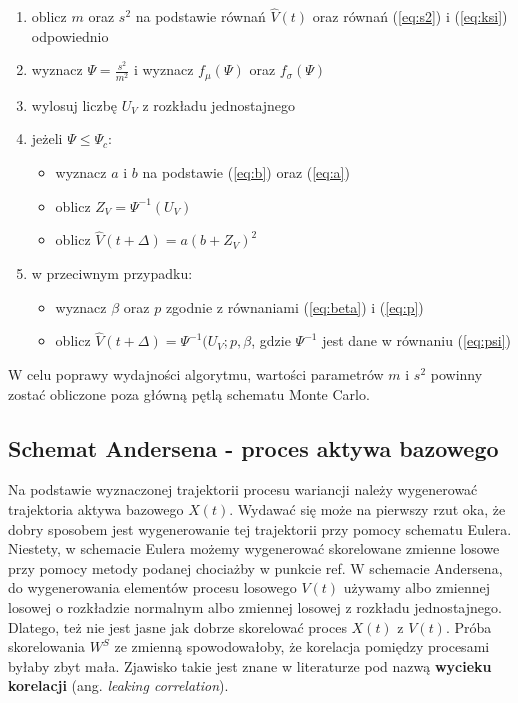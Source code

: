 \documentclass{pracamgr}
\begin{document}
\begin{enumerate}
  \item oblicz $m$ oraz $s^2$ na podstawie równań $\hat{V}(t)$ oraz równań (\ref{eq:s2}) i (\ref{eq:ksi}) odpowiednio
  \item wyznacz $\Psi = \frac{s^2}{m^2}$ i wyznacz $f_{\mu}(\Psi)$ oraz $f_{\sigma}(\Psi)$ 
  \item wylosuj liczbę $U_V$ z rozkładu jednostajnego
  \item jeżeli $\Psi \leq \Psi_c$:
  \begin{itemize} 
  \item wyznacz $a$ i $b$ na podstawie (\ref{eq:b}) oraz (\ref{eq:a})
  \item oblicz $Z_V = \Psi^{-1}(U_V)$
  \item oblicz $\hat{V}(t + \Delta)  = a(b+ Z_V)^2$
  \end{itemize}
  \item w przeciwnym przypadku:
    \begin{itemize} 
  \item wyznacz $\beta$ oraz $p$ zgodnie z równaniami (\ref{eq:beta}) i (\ref{eq:p})
  \item oblicz $\hat{V}(t + \Delta)  =\Psi^{-1}(U_V;p,\beta$, gdzie $\Psi^{-1}$ jest dane w równaniu (\ref{eq:psi})
  \end{itemize}
  
\end{enumerate}


W celu poprawy wydajności algorytmu, wartości parametrów $m$ i $s^2$ powinny zostać obliczone poza główną pętlą schematu Monte Carlo.



\subsection{Schemat Andersena - proces aktywa bazowego}

Na podstawie wyznaczonej trajektorii procesu wariancji należy wygenerować trajektoria aktywa bazowego $X(t)$. Wydawać się może na pierwszy rzut oka, że dobry sposobem jest wygenerowanie tej trajektorii przy pomocy schematu Eulera. Niestety, w schemacie Eulera możemy wygenerować skorelowane zmienne losowe
przy pomocy metody podanej chociażby w punkcie ref.
W schemacie Andersena, do wygenerowania elementów procesu losowego $V(t)$ używamy albo zmiennej losowej o rozkładzie normalnym albo zmiennej losowej z rozkładu jednostajnego. Dlatego, też nie jest jasne jak dobrze skorelować proces $X(t)$ z $V(t)$. Próba skorelowania $W^S$ ze zmienną spowodowałoby, że korelacja pomiędzy procesami byłaby zbyt mała. Zjawisko takie jest znane w literaturze pod nazwą \textbf{wycieku korelacji} (ang. \textit{leaking correlation}). 
\end{document}
